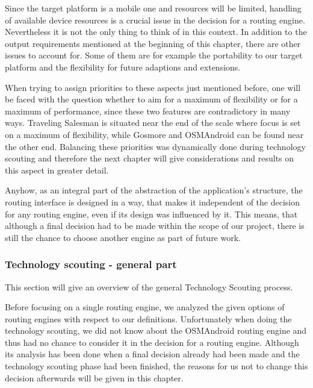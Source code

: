 Since the target platform is a mobile one and resources will be limited, handling of available device resources is a crucial issue in the decision for a routing engine. Nevertheless it is not the only thing to think of in this context. In addition to the output requirements mentioned at the beginning of this chapter, there are other issues to account for. Some of them are for example the portability to our target platform and the flexibility for future adaptions and extensions.\newline

When trying to assign priorities to these aspects just mentioned before, one will be faced with the question whether to aim for a maximum of flexibility or for a maximum of performance, since these two features are contradictory in many ways. Traveling Salesman is situated near the end of the scale where focus is set on a maximum of flexibility, while Gosmore and OSMAndroid can be found near the other end. Balancing these priorities was dynamically done during technology scouting and therefore the next chapter will give considerations and results on this aspect in greater detail.\newline

Anyhow, as an integral part of the abstraction of the application's structure, the routing interface is designed in a way, that makes it independent of the decision for any routing engine, even if its design was influenced by it. This means, that although a final decision had to be made within the scope of our project, there is still the chance to choose another engine as part of future work.\newline

\subsubsection{Technology scouting - general part}

This section will give an overview of the general Technology Scouting process.\newline

Before focusing on a single routing engine, we analyzed the given options of routing engines with respect to our definitions. Unfortunately when doing the technology scouting, we did not know about the OSMAndroid routing engine and thus had no chance to consider it in the decision for a routing engine. Although its analysis has been done when a final decision already had been made and the technology scouting phase had been finished, the reasons for us not to change this decision afterwards will be given in this chapter.\newline

